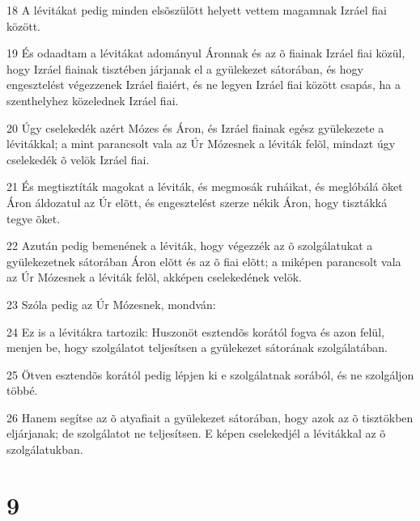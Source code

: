 \par 18 A lévitákat pedig minden elsõszülött helyett vettem magamnak Izráel fiai között.
\par 19 És odaadtam a lévitákat adományul Áronnak és az õ fiainak Izráel fiai közül, hogy Izráel fiainak tisztében járjanak el a gyülekezet sátorában, és hogy engesztelést végezzenek Izráel fiaiért, és ne legyen Izráel fiai között csapás, ha a szenthelyhez közelednek Izráel fiai.
\par 20 Úgy cselekedék azért Mózes és Áron, és Izráel fiainak egész gyülekezete a lévitákkal; a mint parancsolt vala az Úr Mózesnek a léviták felõl, mindazt úgy cselekedék õ velök Izráel fiai.
\par 21 És megtisztíták magokat a léviták, és megmosák ruháikat, és meglóbálá õket Áron áldozatul az Úr elõtt, és engesztelést szerze nékik Áron, hogy tisztákká tegye õket.
\par 22 Azután pedig bemenének a léviták, hogy végezzék az õ szolgálatukat a gyülekezetnek sátorában Áron elõtt és az õ fiai elõtt; a miképen parancsolt vala az Úr Mózesnek a léviták felõl, akképen cselekedének velök.
\par 23 Szóla pedig az Úr Mózesnek, mondván:
\par 24 Ez is a lévitákra tartozik: Huszonöt esztendõs korától fogva és azon felül, menjen be, hogy szolgálatot teljesítsen a gyülekezet sátorának szolgálatában.
\par 25 Ötven esztendõs korától pedig lépjen ki e szolgálatnak sorából, és ne szolgáljon többé.
\par 26 Hanem segítse az õ atyafiait a gyülekezet sátorában, hogy azok az õ tisztökben eljárjanak; de szolgálatot ne teljesítsen. E képen cselekedjél a lévitákkal az õ szolgálatukban.

\chapter{9}


